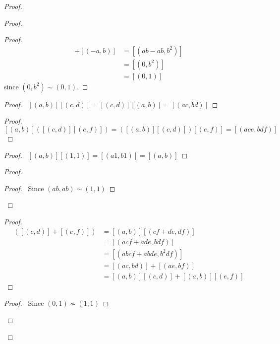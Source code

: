 \documentclass{article}
\let\qed\relax
\theoremstyle{definition}
\begin{document}
\begin{proof}
\begin{proof}
            \begin{proof}
                \pf
                \begin{align*}
                    [(a,b)] + [(-a,b)]
                    & = [(ab-ab,b^2)] \\
                    & = [(0,b^2)] \\
                    & = [(0,1)]
                \end{align*}
                since $(0,b^2) \sim (0,1)$.
            \end{proof}
            \begin{proof}
                \pf\ $[(a,b)][(c,d)] = [(c,d)][(a,b)] = [(ac,bd)]$
            \end{proof}
            \begin{proof}
                \pf\ $[(a,b)]([(c,d)][(e,f)]) = ([(a,b)][(c,d)])[(e,f)] = [(ace,bdf)]$
            \end{proof}
            \begin{proof}
                \pf\ $[(a,b)][(1,1)] = [(a1,b1)] = [(a,b)]$
            \end{proof}
            \begin{proof}
                \begin{proof}
                    \pf\ Since $(ab,ab) \sim (1,1)$
                \end{proof}
            \end{proof}
            \begin{proof}
                \pf
                \begin{align*}
                    [(a,b)]([(c,d)] + [(e,f)])
                    & = [(a,b)][(cf+de,df)] \\
                    & = [(acf+ade,bdf)] \\
                    & = [(abcf+abde,b^2df)] \\
                    & = [(ac,bd)] + [(ae,bf)] \\
                    & = [(a,b)][(c,d)] + [(a,b)][(e,f)]
                \end{align*}
            \end{proof}
            \begin{proof}
                \pf\ Since $(0,1) \nsim (1,1)$
            \end{proof}
        \end{proof}
        \qed
    \end{proof}
\end{document}
